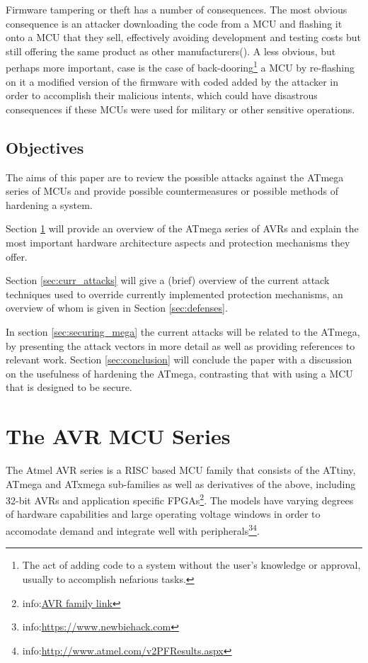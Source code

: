 \documentclass[10pt,a4paper,twocolumn]{article}
\begin{document}
	Firmware tampering or theft has a number of consequences. The most obvious consequence is an attacker downloading the code from a MCU and flashing it onto a MCU that they sell, effectively avoiding development and testing costs but still offering the same product as other manufacturers(\cite{tech:aes_bls}). A less obvious, but perhaps more important, case is the case of back-dooring\footnote{The act of adding code to a system without the user's knowledge or approval, usually to accomplish nefarious tasks.} a MCU by re-flashing on it a modified version of the firmware with coded added by the attacker in order to accomplish their malicious intents, which could have disastrous consequences if these MCUs were used for military or other sensitive operations. 

	\subsection{Objectives}
	The aims of this paper are to review the possible attacks against the ATmega series of MCUs and provide possible countermeasures or possible methods of hardening a system. 
	
	Section \ref{sec:atmega_overview} will provide an overview of the ATmega series of AVRs and explain the most important hardware architecture aspects and protection mechanisms they offer. 
	
	Section \ref{sec:curr_attacks} will give a (brief) overview of the current attack techniques used to override currently implemented protection mechanisms, an overview of whom is given in Section \ref{sec:defenses}. 
	
	In section \ref{sec:securing_mega} the current attacks will be related to the ATmega, by presenting the attack vectors in more detail as well as providing references to relevant work. Section \ref{sec:conclusion} will conclude the paper with a discussion on the usefulness of hardening the ATmega, contrasting that with using a MCU that is designed to be secure.
	
\section{The AVR MCU Series}
\label{sec:atmega_overview}

	The Atmel AVR series is a RISC based MCU family that consists of the ATtiny, ATmega and ATxmega sub-families as well as derivatives of the above, including 32-bit AVRs and application specific FPGAs\footnote{info:\href{http://www.atmel.com/products/microcontrollers/avr/default.aspx}{AVR family link}}. The models have varying degrees of hardware capabilities and large operating voltage windows in order to accomodate demand and integrate well with peripherals\footnote{info:\href{https://www.newbiehack.com/MicrocontrollersAlternativePowerSources.aspx}{https://www.newbiehack.com}}\footnote{info:\href{http://www.atmel.com/v2PFResults.aspx}{http://www.atmel.com/v2PFResults.aspx}}.
	
\end{document}
